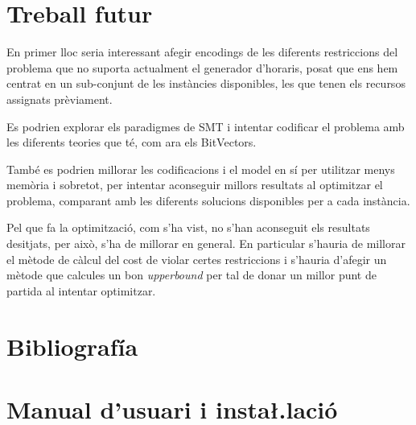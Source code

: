 \documentclass[11pt,a4paper,twoside]{report}
\begin{document}
  
  





  \chapter{Treball futur}

  En primer lloc seria interessant afegir encodings de les diferents restriccions del problema que no suporta actualment el generador d'horaris, posat que ens hem centrat en un sub-conjunt de les instàncies disponibles, les que tenen els recursos assignats prèviament.

  Es podrien explorar els paradigmes de SMT i intentar codificar el problema amb les diferents teories que té, com ara els BitVectors.

  També es podrien millorar les codificacions i el model en sí per utilitzar menys memòria i sobretot, per intentar aconseguir millors resultats al optimitzar el problema, comparant amb les diferents solucions disponibles per a cada instància.

  Pel que fa la optimització, com s'ha vist, no s'han aconseguit els resultats desitjats, per això, s'ha de millorar en general. En particular s'hauria de millorar el mètode de càlcul del cost de violar certes restriccions i s'hauria d'afegir un mètode que calcules un bon \textit{upperbound} per tal de donar un millor punt de partida al intentar optimitzar.

  \nocite{*}
  \chapter{Bibliografía}
  \printbibliography[heading=none]
  \chapter{Manual d'usuari i insta\l.lació}
\end{document}
